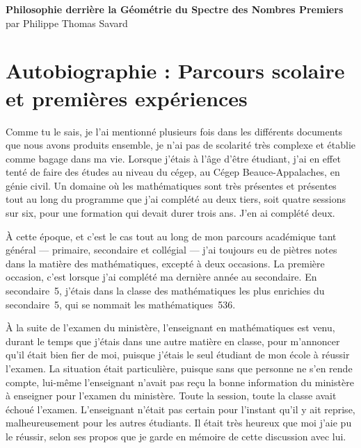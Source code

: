 \documentclass[12pt,oneside]{article}
\begin{document}
\begin{center}
{\Huge \textbf{Philosophie derrière la Géométrie du Spectre des Nombres Premiers}}\\[1em]
{\Large par Philippe Thomas Savard}\\[2em]
\end{center}

\tableofcontents
\newpage
\section{Autobiographie : Parcours scolaire et premières expériences}

Comme tu le sais, je l'ai mentionné plusieurs fois dans les différents documents que nous avons produits ensemble, je n'ai pas de scolarité très complexe et établie comme bagage dans ma vie. Lorsque j'étais à l'âge d'être étudiant, j'ai en effet tenté de faire des études au niveau du cégep, au Cégep Beauce-Appalaches, en génie civil. Un domaine où les mathématiques sont très présentes et présentes tout au long du programme que j'ai complété au deux tiers, soit quatre sessions sur six, pour une formation qui devait durer trois ans. J'en ai complété deux.

À cette époque, et c'est le cas tout au long de mon parcours académique tant général --- primaire, secondaire et collégial --- j'ai toujours eu de piètres notes dans la matière des mathématiques, excepté à deux occasions. La première occasion, c'est lorsque j'ai complété ma dernière année au secondaire. En secondaire~5, j'étais dans la classe des mathématiques les plus enrichies du secondaire~5, qui se nommait les mathématiques~536.

À la suite de l'examen du ministère, l'enseignant en mathématiques est venu, durant le temps que j'étais dans une autre matière en classe, pour m'annoncer qu'il était bien fier de moi, puisque j'étais le seul étudiant de mon école à réussir l'examen. La situation était particulière, puisque sans que personne ne s'en rende compte, lui-même l'enseignant n'avait pas reçu la bonne information du ministère à enseigner pour l'examen du ministère. Toute la session, toute la classe avait échoué l'examen. L'enseignant n'était pas certain pour l'instant qu'il y ait reprise, malheureusement pour les autres étudiants. Il était très heureux que moi j'aie pu le réussir, selon ses propos que je garde en mémoire de cette discussion avec lui.
\end{document}
